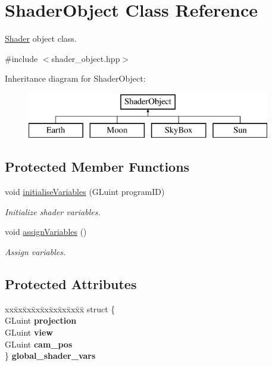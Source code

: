 \hypertarget{classShaderObject}{}\section{Shader\+Object Class Reference}
\label{classShaderObject}


\mbox{\hyperlink{classShader}{Shader}} object class.  




{\ttfamily \#include $<$shader\+\_\+object.\+hpp$>$}

Inheritance diagram for Shader\+Object\+:\begin{figure}[H]
\begin{center}
\leavevmode
\includegraphics[height=2.000000cm]{classShaderObject}
\end{center}
\end{figure}
\subsection*{Protected Member Functions}
\begin{DoxyCompactItemize}
\item 
void \mbox{\hyperlink{classShaderObject_acf1fe66dee8d8163415ab9fe8088d574}{initialise\+Variables}} (G\+Luint program\+ID)
\begin{DoxyCompactList}\small\item\em Initialize shader variables. \end{DoxyCompactList}\item 
void \mbox{\hyperlink{classShaderObject_a8af6206a15f133307bf264aa7007e9bf}{assign\+Variables}} ()
\begin{DoxyCompactList}\small\item\em Assign variables. \end{DoxyCompactList}\end{DoxyCompactItemize}
\subsection*{Protected Attributes}
\begin{DoxyCompactItemize}
\item 
\mbox{\label{classShaderObject_a34d8afac5087103276bc801d0fd1492f}} 
\begin{tabbing}
xx\=xx\=xx\=xx\=xx\=xx\=xx\=xx\=xx\=\kill
struct \{\\
\>GLuint {\bfseries projection}\\
\>GLuint {\bfseries view}\\
\>GLuint {\bfseries cam\_pos}\\
\} {\bfseries global\_shader\_vars}\\

\end{tabbing}\end{DoxyCompactItemize}


